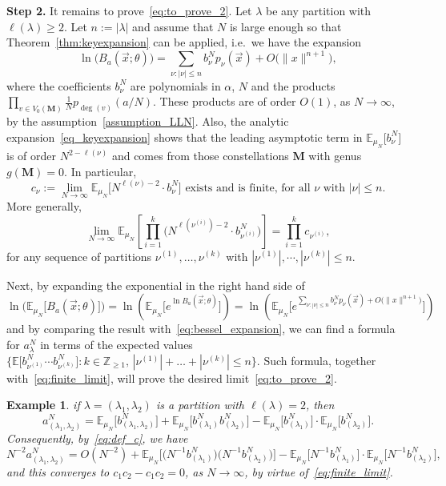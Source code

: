 \documentclass[11pt]{article}
\theoremstyle{plain}
\newtheorem{example}[lemma]{Example}
\newcommand{\Z}{\mathbb Z}
\newcommand{\E}{\mathbb E}
\newcommand{\la}{\lambda}
\newcommand{\MM}{\mathbf M}
\newcommand{\vecx}{\vec{x}}
\begin{document}
\textbf{Step 2.} It remains to prove~\eqref{eq:to_prove_2}.
Let $\la$ be any partition with $\ell(\la)\ge 2$. Let $n:=|\la|$ and assume that $N$ is large enough so that Theorem~\ref{thm:keyexpansion} can be applied, i.e.~we have the expansion
\[
\ln\Big( B_a(\vecx;\theta) \Big) = \sum_{\nu:|\nu|\le n}{ b_\nu^N p_\nu(\vecx) } + O\big( \|x\|^{n+1} \big),
\]
where the coefficients $b_\nu^N$ are polynomials in $\alpha$, $N$ and the products $\prod_{v\in V_0(\MM)}{\frac{1}{N}p_{\deg(v)}(a/N)}$.
These products are of order $O(1)$, as $N\to\infty$, by the assumption~\eqref{assumption_LLN}.
Also, the analytic expansion~\eqref{eq_keyexpansion} shows that the leading asymptotic term in $\E_{\mu_N}\big[b_\nu^N\big]$ is of order $N^{2-\ell(\nu)}$ and comes from those constellations $\MM$ with genus $g(\MM)=0$.
In particular,
\begin{equation}\label{eq:def_c}
c_\nu := \lim_{N\to\infty}{\E_{\mu_N}\big[N^{\ell(\nu)-2}\cdot b_{\nu}^N\big]} \text{ exists and is finite, for all $\nu$ with $|\nu|\le n$}.
\end{equation}
More generally,
\begin{equation}\label{eq:finite_limit}
\lim_{N\to\infty}{\E_{\mu_N}\left[\prod_{i=1}^k \Big(N^{\ell(\nu^{(i)})-2}\cdot b_{\nu^{(i)}}^N\Big) \right]}
= \prod_{i=1}^k{c_{\nu^{(i)}}},
\end{equation}
for any sequence of partitions $\nu^{(1)},\dots,\nu^{(k)}$ with $|\nu^{(1)}|,\cdots,|\nu^{(k)}|\le n$.

\smallskip

Next, by expanding the exponential in the right hand side of
\begin{equation}\label{eq:exp_bs}
\ln\Big( \E_{\mu_N}\big[ B_a(\vecx;\theta) \big] \Big)
= \ln\left( \E_{\mu_N}\bigg[ e^{\ln{B_a(\vecx;\theta)}} \bigg] \right)
= \ln\left( \E_{\mu_N}\bigg[ e^{\sum_{\nu:|\nu|\le n}{ b_\nu^N p_\nu(\vecx) } + O\big( \|x\|^{n+1} \big)} \bigg] \right)
\end{equation}
and by comparing the result with~\eqref{eq:bessel_expansion}, we can find a formula for $a_\la^N$ in terms of the expected values $\Big\{\mathbb{E}\big[b_{\nu^{(1)}}^N\cdots b_{\nu^{(k)}}^N\big] \colon k\in\Z_{\ge 1},\, |\nu^{(1)}|+\dots+|\nu^{(k)}|\le n\Big\}$.
Such formula, together with~\eqref{eq:finite_limit}, will prove the desired limit~\eqref{eq:to_prove_2}.

\begin{example}
if $\la=(\la_1,\la_2)$ is a partition with $\ell(\la)=2$, then
\[
a_{(\la_1,\la_2)}^N = \E_{\mu_N}\Big[ b_{(\la_1,\la_2)}^N \Big] + \E_{\mu_N}\Big[ b_{(\la_1)}^N b_{(\la_2)}^N \Big] - \E_{\mu_N}\Big[ b_{(\la_1)}^N \Big] \cdot\E_{\mu_N}\Big[ b_{(\la_2)}^N \Big].
\]
Consequently, by~\eqref{eq:def_c}, we have
\[
N^{-2}a_{(\la_1,\la_2)}^N = O(N^{-2}) + \E_{\mu_N}\Big[ \big(N^{-1} b_{(\la_1)}^N\big) \big(N^{-1} b_{(\la_2)}^N\big) \Big] - \E_{\mu_N}\Big[ N^{-1} b_{(\la_1)}^N \Big] \cdot\E_{\mu_N}\Big[ N^{-1} b_{(\la_2)}^N \Big],
\]
and this converges to $c_1c_2 - c_1c_2=0$, as $N\to\infty$, by virtue of~\eqref{eq:finite_limit}.
\end{example}
\end{document}
